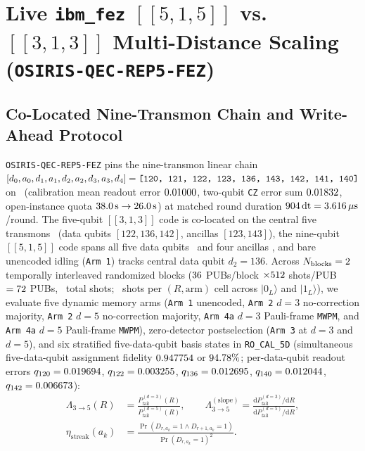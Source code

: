 \documentclass[aps,prx,twocolumn,superscriptaddress,nofootinbib]{revtex4-2}
\begin{document}
\section{Live \texttt{ibm\_fez} $[[5,1,5]]$ vs.\ $[[3,1,3]]$ Multi-Distance Scaling (\texttt{OSIRIS-QEC-REP5-FEZ})}

\subsection{Co-Located Nine-Transmon Chain and Write-Ahead Protocol}
\texttt{OSIRIS-QEC-REP5-FEZ} pins the nine-transmon linear chain $[d_0, a_0, d_1, a_1, d_2, a_2, d_3, a_3, d_4] = \texttt{[120, 121, 122, 123, 136, 143, 142, 141, 140]}$ on \rfsBackend\ (calibration mean readout error $0.01000$, two-qubit \texttt{CZ} error sum $0.01832$, open-instance quota $38.0\,\mathrm{s} \to 26.0\,\mathrm{s}$) at matched round duration $904\,\mathrm{dt} = 3.616\,\mu\mathrm{s}$/round. The five-qubit $[[3,1,3]]$ code is co-located on the central five transmons \rfsRepThreeSubChain\ (data qubits $[122, 136, 142]$, ancillas $[123, 143]$), the nine-qubit $[[5,1,5]]$ code spans all five data qubits \rfsRepFiveDataChain\ and four ancillas \rfsRepFiveAncChain, and bare unencoded idling (\texttt{Arm 1}) tracks central data qubit $d_2 = 136$. Across $N_{\mathrm{blocks}} = 2$ temporally interleaved randomized blocks ($36$ PUBs/block $\times 512$ shots/PUB $= 72$ PUBs, \rfsRepFiveTotalShots\ total shots; \rfsRepFiveShotsPerCell\ shots per $(R, \text{arm})$ cell across $|0_L\rangle$ and $|1_L\rangle$), we evaluate five dynamic memory arms (\texttt{Arm 1} unencoded, \texttt{Arm 2} $d=3$ no-correction majority, \texttt{Arm 2} $d=5$ no-correction majority, \texttt{Arm 4a} $d=3$ Pauli-frame \texttt{MWPM}, and \texttt{Arm 4a} $d=5$ Pauli-frame \texttt{MWPM}), zero-detector postselection (\texttt{Arm 3} at $d=3$ and $d=5$), and six stratified five-data-qubit basis states in \texttt{RO\_CAL\_5D} (simultaneous five-data-qubit assignment fidelity $0.947754$ or $94.78\%$; per-data-qubit readout errors $q_{120}=0.019694$, $q_{122}=0.003255$, $q_{136}=0.012695$, $q_{140}=0.012044$, $q_{142}=0.006673$):
\begin{align}
  \Lambda_{3\to 5}(R) &= \frac{P_{\mathrm{fail}}^{(d=3)}(R)}{P_{\mathrm{fail}}^{(d=5)}(R)}, \qquad
  \Lambda_{3\to 5}^{(\mathrm{slope})} = \frac{\mathrm{d}P_{\mathrm{fail}}^{(d=3)}/\mathrm{d}R}{\mathrm{d}P_{\mathrm{fail}}^{(d=5)}/\mathrm{d}R}, \nonumber\\
  \eta_{\mathrm{streak}}(a_k) &= \frac{\Pr(D_{r,a_k}=1 \land D_{r+1,a_k}=1)}{\Pr(D_{r,a_k}=1)^2}.
  \label{eq:rep5_lambda_streaks}
\end{align}
\end{document}
